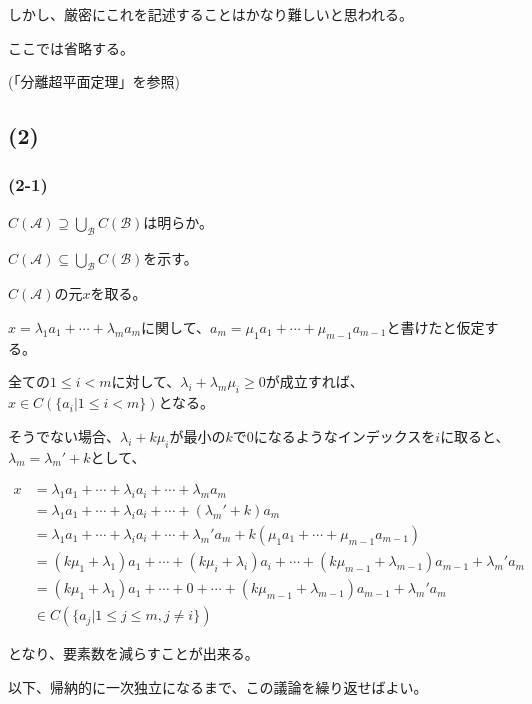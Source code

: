 \documentclass[a4paper, 10pt, dvipdfmx]{jlreq}
\begin{document}
しかし、厳密にこれを記述することはかなり難しいと思われる。

ここでは省略する。

(「分離超平面定理」を参照)

\subsection*{(2)}

\subsubsection*{(2-1)}

$C(\mathcal{A}) \supseteq \bigcup_{\mathcal{B}}C(\mathcal{B})$は明らか。

$C(\mathcal{A}) \subseteq \bigcup_{\mathcal{B}}C(\mathcal{B})$を示す。

$C(\mathcal{A})$の元$x$を取る。

$x=\lambda_1 a_1+ \cdots + \lambda_m a_m$に関して、$a_m=\mu_1 a_1 + \cdots + \mu_{m-1} a_{m-1}$と書けたと仮定する。

全ての$1 \leq i < m$に対して、$\lambda_i+\lambda_m \mu_i \geq 0$が成立すれば、$x \in C(\{a_i | 1 \leq i < m \})$となる。

そうでない場合、$\lambda_i+k \mu_i$が最小の$k$で0になるようなインデックスを$i$に取ると、$\lambda_m=\lambda_m'+k$として、

\begin{align*}
  x & =\lambda_1 a_1 + \cdots + \lambda_i a_i + \cdots + \lambda_m a_m                                                       \\
    & =\lambda_1 a_1 + \cdots + \lambda_i a_i + \cdots +(\lambda_m'+k) a_m                                                   \\
    & =\lambda_1 a_1 + \cdots + \lambda_i a_i + \cdots + \lambda_m' a_m + k(\mu_1a_1+\cdots+\mu_{m-1}a_{m-1})                \\
    & =(k\mu_1+\lambda_1) a_1 + \cdots + (k\mu_i+\lambda_i)a_i + \cdots + (k \mu_{m-1}+\lambda_{m-1}) a_{m-1}+\lambda_m' a_m \\
    & =(k\mu_1+\lambda_1) a_1 + \cdots + 0 + \cdots + (k \mu_{m-1}+\lambda_{m-1}) a_{m-1}+\lambda_m' a_m                     \\
    & \in C(\{a_j | 1 \leq j \leq m, j\neq i \})
\end{align*}

となり、要素数を減らすことが出来る。

以下、帰納的に一次独立になるまで、この議論を繰り返せばよい。
\end{document}
